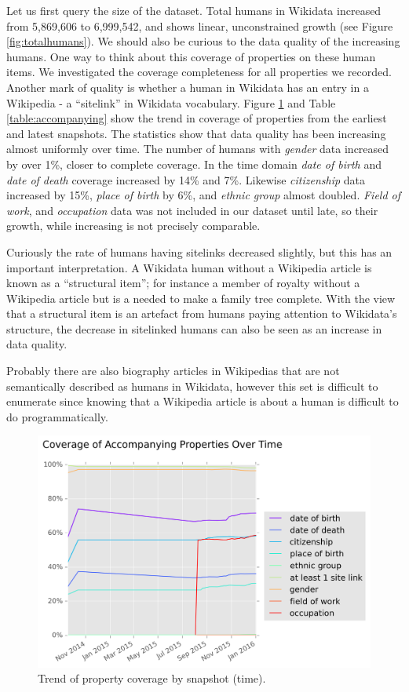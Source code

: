 \documentclass[letterpaper]{article}
\begin{document}
Let us first query the size of the dataset. Total humans in Wikidata increased from 5,869,606 to 6,999,542, and shows linear, unconstrained growth (see Figure \ref{fig:totalhumans}).
We should also be curious to the data quality of the increasing humans. One way to think about this coverage of properties on these human items. We investigated the coverage completeness for all  properties we recorded. Another mark of quality is whether a human in Wikidata has an entry in a Wikipedia - a ``sitelink'' in Wikidata vocabulary. Figure \ref{fig:accompanying} and Table \ref{table:accompanying} show the trend in coverage of properties from the earliest and latest snapshots. The statistics show that data quality has been increasing almost uniformly over time. The number of humans with \textit{gender} data increased by over 1\%, closer to complete coverage. In the time domain \textit{date of birth} and \textit{date of death} coverage increased by 14\% and 7\%. Likewise \textit{citizenship} data increased by 15\%, \textit{place of birth} by 6\%, and \textit{ethnic group} almost doubled. \textit{Field of work}, and \textit{occupation} data was not included in our dataset until late, so their growth, while increasing is not precisely comparable.

Curiously the rate of humans having sitelinks decreased slightly, but this has an important interpretation. A Wikidata human without a Wikipedia article is known as a ``structural item''; for instance a member of royalty without a Wikipedia article but is a needed to make a family tree complete. With the view that a structural item is an artefact from humans paying attention to Wikidata's structure, the decrease in sitelinked humans can also be seen as an increase in data quality. 

Probably there are also biography articles in Wikipedias that are not semantically described as humans in Wikidata, however this set is difficult to enumerate since knowing that a Wikipedia article is about a human is difficult to do programmatically. 


\begin{figure}
\includegraphics[scale=0.5]{figures/additionalprops.png} 
\caption{Trend of property coverage by snapshot (time).}
\label{fig:accompanying}
\end{figure}
\end{document}
